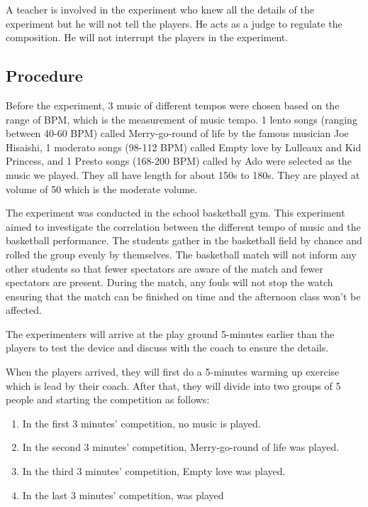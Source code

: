 \documentclass{article}
\begin{document}
A teacher is involved in the experiment who knew all the details of the experiment but he will not tell the players. He acts as a judge to regulate the composition. He will not interrupt the players in the experiment. 

\subsection{Procedure}

Before the experiment, 3 music of different tempos were chosen based on the range of BPM, which is the measurement of music tempo. 1 lento songs (ranging between 40-60 BPM) called Merry-go-round of life by the famous musician Joe Hisaishi, 1 moderato songs (98-112 BPM) called Empty love by Lulleaux and Kid Princess, and 1 Presto songs (168-200 BPM) called  by Ado were selected as the music we played.\autocite{HelloMusicTheory2022} They all have length for about 150s to 180s. They are played at volume of 50 which is the moderate volume.

The experiment was conducted in the school basketball gym. This experiment aimed to investigate the correlation between the different tempo of music and the basketball performance. The students gather in the basketball field by chance and rolled the group evenly by themselves. The basketball match will not inform any other students so that fewer spectators are aware of the match and fewer spectators are present. During the match, any fouls will not stop the watch ensuring that the match can be finished on time and the afternoon class won't be affected.

The experimenters will arrive at the play ground 5-minutes earlier than the players to test the device and discuss with the coach to ensure the details. 

When the players arrived, they will first do a 5-minutes warming up exercise which is lead by their coach. After that, they will divide into two groups of 5 people and starting the competition as follows:

\begin{enumerate}
    \item In the first 3 minutes' competition, no music is played. 
    \item In the second 3 minutes' competition, Merry-go-round of life was played.
    \item In the third 3 minutes' competition, Empty love was played.
    \item In the last 3 minutes' competition,  was played
\end{enumerate}
\end{document}
